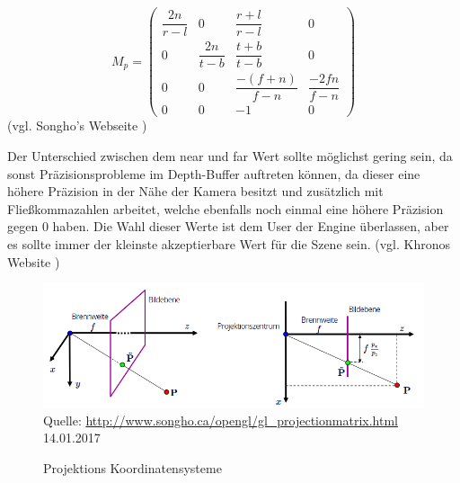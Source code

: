 $$ M_{p} = \begin{pmatrix}
\dfrac{2n}{r-l} & 0 & \dfrac{r+l}{r-l} & 0 \\
0 & \dfrac{2n}{t-b} & \dfrac{t+b}{t-b} & 0 \\
0 & 0 & \dfrac{-(f+n)}{f-n} & \dfrac{-2fn}{f-n} \\
0 & 0 & -1 & 0
\end{pmatrix} $$
(vgl. Songho's Webseite \cite{ProjectionMatrixWeb})

Der Unterschied zwischen dem near und far Wert sollte möglichst gering sein, da sonst Präzisionsprobleme im Depth-Buffer auftreten können, da dieser eine höhere Präzision in der Nähe der Kamera besitzt und zusätzlich mit Fließkommazahlen arbeitet, welche ebenfalls noch einmal eine höhere Präzision gegen 0 haben. Die Wahl dieser Werte ist dem User der Engine überlassen, aber es sollte immer der kleinste akzeptierbare Wert für die Szene sein. (vgl. Khronos Website \cite{DepthProblem})

\begin{figure}[h]
	\centering
	\includegraphics[width=\textwidth]{02theorie/perspektivischeprojektion.png}
	Quelle: \url{http://www.songho.ca/opengl/gl_projectionmatrix.html}	
	14.01.2017
	\caption{Projektions Koordinatensysteme}\label{img:projection}
\end{figure}
